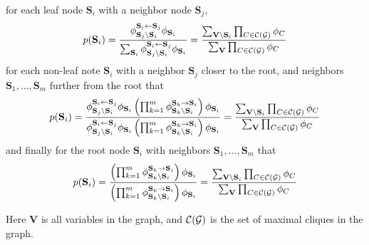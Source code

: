 \documentclass[11pt]{article}
\renewcommand{\vec}[1]{\mathbf{#1}}
\begin{document}
\begin{itemize}
for each leaf node $\vec{S}_i$ with a neighbor node $\vec{S}_j$,
{\small
\begin{align*}
p(\vec{S}_i) =
\frac{
\phi^{\vec{S}_i \gets \vec{S}_j}_{\vec{S}_j \setminus \vec{S}_i} \phi_{\vec{S}_i}
}{
\sum_{\vec{S}_i}
\phi^{\vec{S}_i \gets \vec{S}_j}_{\vec{S}_j \setminus \vec{S}_i} \phi_{\vec{S}_i}
}
=
\frac{
\sum_{\vec{V} \setminus \vec{S}_i} \prod_{C \in {\cal C}({\cal G})} \phi_C
}{
\sum_{\vec{V}} \prod_{C \in {\cal C}({\cal G})} \phi_C
}
\end{align*}
}
for each non-leaf note $\vec{S}_i$ with a neighbor $\vec{S}_j$ closer to the root, and neighbors $\vec{S}_1, \ldots, \vec{S}_m$ further from the root that
{\small
\begin{align*}
p(\vec{S}_i) =
\frac{
\phi^{\vec{S}_i \gets \vec{S}_j}_{\vec{S}_j \setminus \vec{S}_i} \phi_{\vec{S}_i}
\left( \prod_{k=1}^m \phi^{\vec{S}_k \to \vec{S}_i}_{\vec{S}_k \setminus \vec{S}_i} \right) \phi_{\vec{S}_i}
}{
\phi^{\vec{S}_i \gets \vec{S}_j}_{\vec{S}_j \setminus \vec{S}_i} \phi_{\vec{S}_i}
\left( \prod_{k=1}^m \phi^{\vec{S}_k \to \vec{S}_i}_{\vec{S}_k \setminus \vec{S}_i} \right) \phi_{\vec{S}_i}
}
=
\frac{
\sum_{\vec{V} \setminus \vec{S}_i} \prod_{C \in {\cal C}({\cal G})} \phi_C
}{
\sum_{\vec{V}} \prod_{C \in {\cal C}({\cal G})} \phi_C
}
\end{align*}
}
and finally for the root node $\vec{S}_i$ with neighbors $\vec{S}_1, \ldots, \vec{S}_m$ that
{\small
\begin{align*}
p(\vec{S}_i) =
\frac{
\left( \prod_{k=1}^m \phi^{\vec{S}_k \to \vec{S}_i}_{\vec{S}_k \setminus \vec{S}_i} \right) \phi_{\vec{S}_i}
}{
\left( \prod_{k=1}^m \phi^{\vec{S}_k \to \vec{S}_i}_{\vec{S}_k \setminus \vec{S}_i} \right) \phi_{\vec{S}_i}
}
=
\frac{
\sum_{\vec{V} \setminus \vec{S}_i} \prod_{C \in {\cal C}({\cal G})} \phi_C
}{
\sum_{\vec{V}} \prod_{C \in {\cal C}({\cal G})} \phi_C
}
\end{align*}
}
\end{itemize}

Here $\vec{V}$ is all variables in the graph, and ${\cal C}({\cal G})$ is the set of maximal cliques in the graph.

\begin{answertext}{15cm}{}

\end{answertext}
\end{document}
